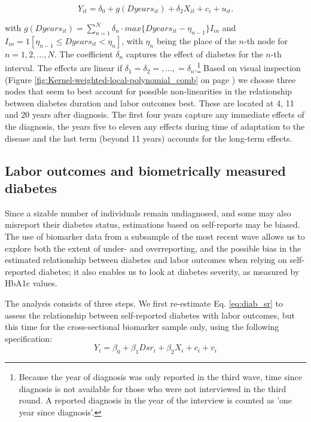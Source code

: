 \documentclass[12pt,english]{article}
\begin{document}
\begin{equation}
Y_{it}=\delta_{0}+g(Dyears_{it})+\delta_{2}X_{it}+c_{i}+u_{it}.\label{eq:splines}
\end{equation}

\noindent with $g(Dyears_{it})=\sum_{n=1}^{N}\delta_{n}\cdot max\{Dyears_{it}-\eta_{n-1}\}I_{in}$ and $I_{in}=1[\eta_{n-1}\leq Dyears_{it}<\eta_{n}]$, with $\eta_{n}$ being the place of the $n$-th node for $n=1,2,\ldots,N$. The coefficient $\delta_{n}$ captures the effect of diabetes for the $n$-th interval. The effects are linear if $\delta_{1}=\delta_{2}=,\ldots,=\delta_{n}$.\footnote{Because the year of diagnosis was only reported in the third wave, time since diagnosis is not available for those who were not interviewed in the third round.  A reported diagnosis in the year of the interview is counted as 'one year since diagnosis'.} Based on visual inspection (Figure \ref{fig:Kernel-weighted-local-polynomial_comb} on page \pageref{fig:Kernel-weighted-local-polynomial_comb}) we choose three nodes that seem to best account for possible non-linearities in the relationship between diabetes duration and labor outcomes best. These are located at 4, 11 and 20 years after diagnosis. The first four years capture any immediate effects of the diagnosis, the years five to eleven any effects during time of adaptation to the disease and the last term (beyond 11 years) accounts for the long-term effects.

\subsection{\label{sec:Biomarker Strategy}Labor outcomes and biometrically measured diabetes}

Since a sizable number of individuals remain undiagnosed, and some may also misreport their diabetes status, estimations based on self-reports may be biased. The use of biomarker data from a subsample of the most recent wave allows us to explore both the extent of under- and overreporting, and the possible bias in the estimated relationship between diabetes and labor outcomes when relying on self-reported diabetes; it also enables us to look at diabetes severity, as measured by \ac{HbA1c} values. 

The analysis consists of three steps. We first re-estimate Eq. \ref{eq:diab_sr} to assess the relationship between self-reported diabetes with labor outcomes, but this time for the cross-sectional biomarker sample only, using the following specification:
\begin{equation}
Y_{i}=\beta_{0}+\beta_{1}Dsr_{i}+\beta_{2}X_{i}+c_{i}+v_{i}\label{eq:diab_sr}
\end{equation}
\end{document}
